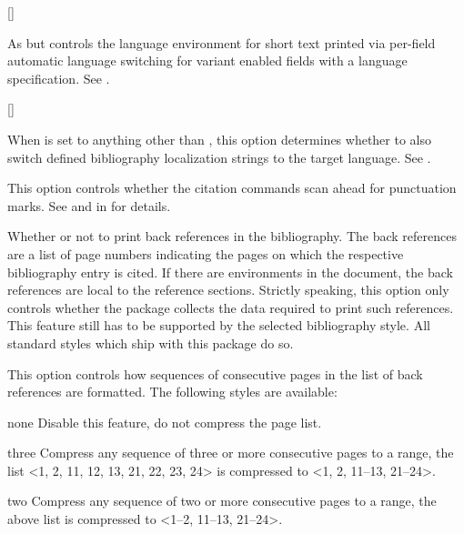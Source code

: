 \documentclass{ltxdockit}[2011/03/25]
\begin{document}
\begin{optionlist}
\begin{valuelist}
\end{valuelist}

[\BiberOnly]

As  but controls the language environment for short text printed via per-field automatic language switching for variant enabled fields with a language specification. See .

[\BiberOnly]

When  is set to anything other than , this option determines whether to also switch defined bibliography localization strings to the target language. See .


This option controls whether the citation commands scan ahead for punctuation marks. See  and  in  for details.


Whether or not to print back references in the bibliography. The back references are a list of page numbers indicating the pages on which the respective bibliography entry is cited. If there are  environments in the document, the back references are local to the reference sections. Strictly speaking, this option only controls whether the  package collects the data required to print such references. This feature still has to be supported by the selected bibliography style. All standard styles which ship with this package do so.


This option controls how sequences of consecutive pages in the list of back references are formatted. The following styles are available:

\begin{valuelist}

\item[none] Disable this feature, \ie do not compress the page list.

\item[three] Compress any sequence of three or more consecutive pages to a range, \eg the list <1, 2, 11, 12, 13, 21, 22, 23, 24> is compressed to <1, 2, 11--13, 21--24>.

\item[two] Compress any sequence of two or more consecutive pages to a range, \eg the above list is compressed to <1--2, 11--13, 21--24>.


\end{valuelist}
\end{optionlist}
\end{document}
